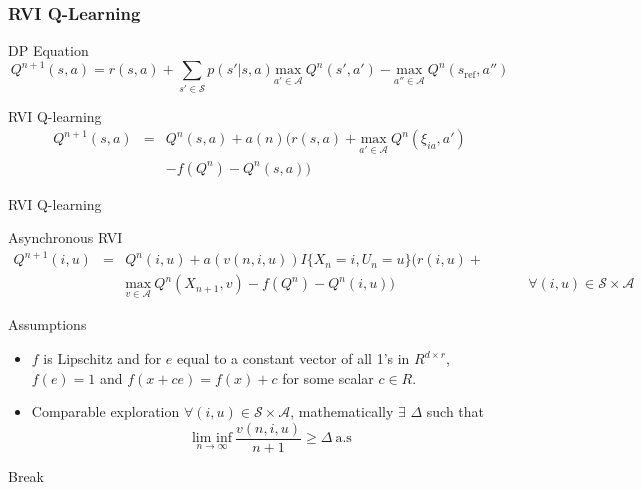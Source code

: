 \documentclass{beamer}
\begin{document}
\begin{frame}
\frametitle{RVI Q-Learning}
\begin{block}{DP Equation}
\[Q^{n+1}(s,a) = r(s,a)+\sum_{s'\in\mathcal{S}}p(s'|s,a)\underset{a'\in\mathcal{A}}{\text{max}}\ Q^n(s',a')-\underset{a''\in\mathcal{A}}{\text{max}}\ Q^n(s_{\text{ref}},a'')\]
\end{block}

\begin{block}{RVI Q-learning}
\begin{eqnarray}
    Q^{n+1}(s,a) &=& Q^{n}(s,a) +a(n)\Big(r(s,a)+\underset{a'\in\mathcal{A}}{\text{max}}\ Q^n(\xi_{ia},a')\nonumber\\ 
    && -f(Q^n)-Q^{n}(s,a)\Big)\nonumber
\end{eqnarray}
\end{block}
\end{frame}

\begin{frame}{RVI Q-learning}
\begin{block}{Asynchronous RVI}
\begin{eqnarray}
    Q^{n+1}(i,u) &=& Q^{n}(i,u) +a(v(n,i,u))I\{X_n=i,U_n=u\}\Big(r(i,u)+\nonumber\\ &&\underset{v\in\mathcal{A}}{\text{max}}\ Q^n(X_{n+1},v)-f(Q^n)-Q^{n}(i,u)\Big)  \hspace{4cm} \forall (i,u)\in \mathcal{S}\times\mathcal{A}\nonumber
\end{eqnarray}
\end{block}

\begin{block}{Assumptions}
\begin{itemize}
    \item $f$ is Lipschitz and for $e$ equal to a constant vector of all 1's in $R^{d\times r}$, $f(e)=1$ and $f(x+ce)=f(x)+c$ for some scalar $c\in R$.
    \item Comparable exploration $\forall (i,u)\in \mathcal{S}\times\mathcal{A}$, mathematically $\exists $ $\Delta$ such that
\[\underset{n\rightarrow\infty}{\text{lim inf}}\ \dfrac{v(n,i,u)}{n+1}\geq \Delta \ \text{a.s}\]
\end{itemize}
\end{block}
\end{frame}
\begin{frame}
\Huge{\centerline{Break}}
\end{frame}
\end{document}

